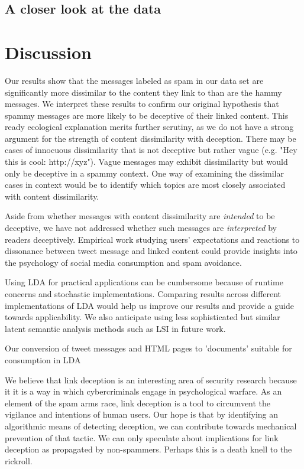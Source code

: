 \documentclass[times, 11pt, twocolumn]{article}
\begin{document}
\subsection{A closer look at the data}

\section{Discussion}

Our results show that the messages labeled as spam in our data set are significantly more dissimilar
to the content they link to than are the hammy messages.
We interpret these results to confirm our original hypothesis that spammy messages are more likely to be
deceptive of their linked content.
This ready ecological explanation merits further scrutiny, as we do not have a strong 
argument for the strength of content dissimilarity with deception.
There may be cases of innocuous dissimilarity that is not deceptive but rather vague (e.g. "Hey this is cool: http://xyz").
Vague messages may exhibit dissimilarity but would only be deceptive in a spammy context.
One way of examining the dissimilar cases in context would be to identify which topics are most closely
associated with content dissimilarity.

Aside from whether messages with content dissimilarity are \emph{intended} to be deceptive,
we have not addressed whether such messages are \emph{interpreted} by readers deceptively.
Empirical work studying users' expectations and reactions to dissonance between tweet message
and linked content could provide insights into the psychology of social media consumption
and spam avoidance.

Using LDA for practical applications can be cumbersome because of runtime concerns and stochastic
implementations.
Comparing results across different implementations of LDA would help us improve our results and
provide a guide towards applicability.
We also anticipate using less sophisticated but similar latent semantic analysis methods such
as LSI in future work.

Our conversion of tweet messages and HTML pages to 'documents' suitable for consumption in LDA

We believe that link deception is an interesting area of security research because it
it is a way in which cybercriminals engage in psychological warfare.
As an element of the spam arms race, link deception is a tool to circumvent
the vigilance and intentions of human users.
Our hope is that by identifying an algorithmic means of detecting deception,
we can contribute towards mechanical prevention of that tactic.
We can only speculate about implications for link deception as propagated
by non-spammers.  Perhaps this is a death knell to the rickroll.



\end{document}

